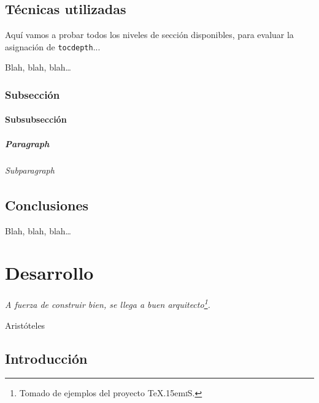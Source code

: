 \documentclass[spanish,openright]{book}
\def\texis{\TeX \raise.15em\hbox{\textsc{i}}S}
\newenvironment{FraseCelebre}{\begin{list}{}{\setlength{\leftmargin}{0.5\textwidth}\setlength{\parsep}{0cm}\addtolength{\topsep}{0.5cm}}
}
{\unskip \end{list}}
\newenvironment{Frase}{\item \begin{flushright}\small\em}{\end{flushright}}
\newenvironment{Fuente}{\item \begin{flushright}\small}{\end{flushright}}
\begin{document}
\section{Técnicas utilizadas}
\label{sec:tecnicas-utilizadas}

Aquí vamos a probar todos los niveles de sección disponibles, para
evaluar la asignación de \texttt{tocdepth}...

Blah, blah, blah\ldots


\subsection{Subsección}
\label{sec:subseccion}


\subsubsection{Subsubsección}
\label{sec:subsubseccion}

\paragraph{Paragraph}
\label{sec:paragraph-1}


\subparagraph{Subparagraph}
\label{sec:subparagraph}



\section{Conclusiones}
\label{sec:conclusiones-teoria}

Blah, blah, blah\ldots




\chapter{Desarrollo}
\label{cha:desarrollo}


\begin{FraseCelebre}
\begin{Frase}
A fuerza de construir bien, se llega a buen
arquitecto\footnote{Tomado de ejemplos del proyecto \texis{}.}.
\end{Frase}
\begin{Fuente}
Aristóteles
\end{Fuente}
\end{FraseCelebre}

\section{Introducción}
\label{sec:introduccion-desarrollo}
\end{document}
